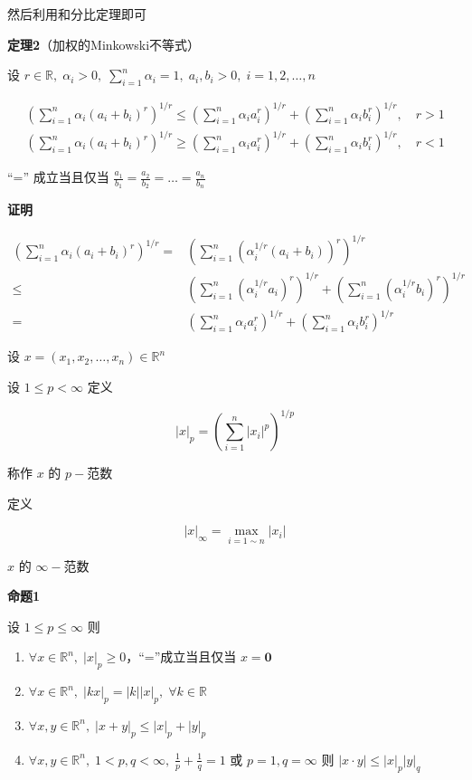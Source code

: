 然后利用和分比定理即可

\textbf{定理2}（加权的Minkowski不等式）

设
\(r\in \mathbb{R}, \; \alpha_{i}>0, \; \sum_{i=1}^{n}\alpha_{i}=1, \; a_{i},b_{i}>0, \; i=1,2,\dots,n\)

\[
\begin{aligned}
\left( \sum_{i=1}^{n}\alpha_{i}(a_{i}+b_{i})^{r} \right)^{1/r}\leq
\left( \sum_{i=1}^{n} \alpha_{i} a_{i}^{r} \right)^{1/r}+\left( \sum_{i=1}^{n}\alpha _{i}b_{i}^{r} \right)^{1/r}, \quad r>1
\\
\left( \sum_{i=1}^{n}\alpha_{i}(a_{i}+b_{i})^{r} \right)^{1/r}\geq
\left( \sum_{i=1}^{n} \alpha_{i} a_{i}^{r} \right)^{1/r}+\left( \sum_{i=1}^{n}\alpha _{i}b_{i}^{r} \right)^{1/r}, \quad r<1
\end{aligned}
\]

``='' 成立当且仅当
\(\frac{a_{1}}{b_{1}}=\frac{a_{2}}{b_{2}}=\dots=\frac{a_{n}}{b_{n}}\)

\textbf{证明}

\[
\begin{aligned}
\left( \sum_{i=1}^{n}\alpha_{i}(a_{i}+b_{i})^{r} \right)^{1/r}
=&\left( \sum_{i=1}^{n}\left(\alpha_{i}^{1/r}(a_{i}+b_{i})\right)^{r} \right)^{1/r}
\\
\leq&
\left( \sum_{i=1}^{n} \left(\alpha_{i}^{1/r} a_{i}\right)^{r} \right)^{1/r}+\left( \sum_{i=1}^{n}\left(\alpha _{i}^{1/r}b_{i}\right)^{r} \right)^{1/r}
\\
=&\left( \sum_{i=1}^{n} \alpha_{i} a_{i}^{r} \right)^{1/r}+\left( \sum_{i=1}^{n}\alpha _{i}b_{i}^{r} \right)^{1/r}
\end{aligned}
\]

设 \(x=(x_{1},x_{2},\dots,x_{n})\in \mathbb{R}^{n}\)

设 \(1\leq p<\infty\) 定义

\[
|x|_{p}=\left( \sum_{i=1}^{n}|x_{i}|^{p} \right)^{1/p}
\]

称作 \(x\) 的 \(p-\)范数

定义

\[
|x|_{\infty}=\max_{i=1\sim n} |x_{i}|
\]

\(x\) 的 \(\infty-\)范数

\textbf{命题1}

设 \(1\leq p\leq \infty\) 则

\begin{enumerate}
\def\labelenumi{\arabic{enumi}.}
\tightlist
\item
  \(\forall x \in \mathbb{R}^{n}, \; |x|_{p}\geq 0\)，``=''成立当且仅当
  \(x=\mathbf{0}\)
\item
  \(\forall x \in \mathbb{R}^{n}, \;|kx|_{p}=|k||x|_{p}, \; \forall k \in \mathbb{R}\)
\item
  \(\forall x,y \in \mathbb{R}^{n}, \; |x+y|_{p}\leq |x|_{p}+|y|_{p}\)
\item
  \(\forall x, y \in \mathbb{R}^{n}, \; 1<p,q<\infty, \; \frac{1}{p}+\frac{1}{q}=1\)
  或 \(p=1,q=\infty\) 则 \(|x\cdot y|\leq|x|_{p}|y|_{q}\)
\end{enumerate}

